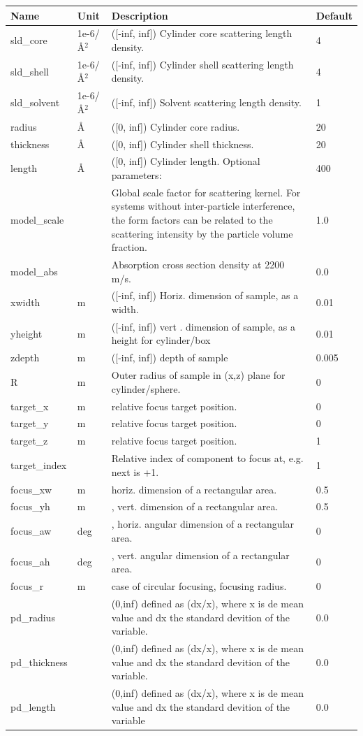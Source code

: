 \begin{longtable}{p{}p{}p{}p{}}
\toprule
\textbf{Name} & \textbf{Unit} & \textbf{Description} & \textbf{Default} \\
\midrule
\endhead
sld\_core & 1e-6/\AA{}$^{2}$ & ([-inf, inf]) Cylinder core scattering length density. & 4 \\
sld\_shell & 1e-6/\AA{}$^{2}$ & ([-inf, inf]) Cylinder shell scattering length density. & 4 \\
sld\_solvent & 1e-6/\AA{}$^{2}$ & ([-inf, inf]) Solvent scattering length density. & 1 \\
radius & \AA{} & ([0, inf]) Cylinder core radius. & 20 \\
thickness & \AA{} & ([0, inf]) Cylinder shell thickness. & 20 \\
length & \AA{} & ([0, inf]) Cylinder length. Optional parameters: & 400 \\
model\_scale &   & Global scale factor for scattering kernel. For systems without inter-particle interference, the form factors can be related to the scattering intensity by the particle volume fraction. & 1.0 \\
model\_abs &   & Absorption cross section density at 2200 m/s. & 0.0 \\
xwidth & m & ([-inf, inf]) Horiz. dimension of sample, as a width. & 0.01 \\
yheight & m & ([-inf, inf]) vert . dimension of sample, as a height for cylinder/box & 0.01 \\
zdepth & m & ([-inf, inf]) depth of sample & 0.005 \\
R & m & Outer radius of sample in (x,z) plane for cylinder/sphere. & 0 \\
target\_x & m & relative focus target position. & 0 \\
target\_y & m & relative focus target position. & 0 \\
target\_z & m & relative focus target position. & 1 \\
target\_index &   & Relative index of component to focus at, e.g. next is +1. & 1 \\
focus\_xw & m & horiz. dimension of a rectangular area. & 0.5 \\
focus\_yh & m & , vert. dimension of a rectangular area. & 0.5 \\
focus\_aw & deg & , horiz. angular dimension of a rectangular area. & 0 \\
focus\_ah & deg & , vert. angular dimension of a rectangular area. & 0 \\
focus\_r & m & case of circular focusing, focusing radius. & 0 \\
pd\_radius &  & (0,inf) defined as (dx/x), where x is de mean value and dx the standard devition of the variable. & 0.0 \\
pd\_thickness &  & (0,inf) defined as (dx/x), where x is de mean value and dx the standard devition of the variable. & 0.0 \\
pd\_length &  & (0,inf) defined as (dx/x), where x is de mean value and dx the standard devition of the variable & 0.0 \\
\bottomrule
\end{longtable}

